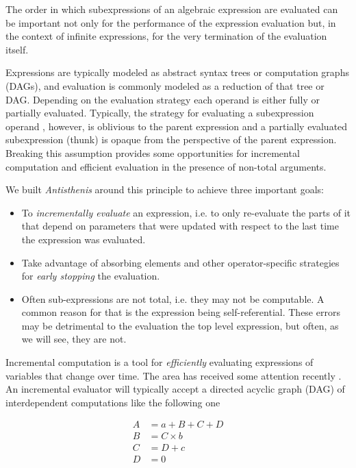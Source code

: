 The order in which subexpressions of an algebraic expression are
evaluated can be important not only for the performance of the
expression evaluation but, in the context of infinite expressions, for
the very termination of the evaluation itself.

Expressions are typically modeled as abstract syntax trees or
computation graphs (DAGs), and evaluation is commonly modeled as a
reduction of that tree or DAG. Depending on the evaluation strategy
each operand is either fully or partially evaluated. Typically, the
strategy for evaluating a subexpression operand , however, is
oblivious to the parent expression and a partially evaluated
subexpression (thunk) is opaque from the perspective of the parent
expression. Breaking this assumption provides some opportunities for
incremental computation and efficient evaluation in the presence of
non-total arguments.

We built \emph{Antisthenis} around this principle to achieve three
important goals:

\begin{itemize}
\item To \emph{incrementally evaluate} an expression, i.e. to only
  re-evaluate the parts of it that depend on parameters that were
  updated with respect to the last time the expression was evaluated.
\item Take advantage of absorbing elements and other operator-specific
  strategies for \emph{early stopping} the evaluation.
\item Often sub-expressions are not total, i.e. they may not be
  computable. A common reason for that is the expression being
  self-referential. These errors may be detrimental to the evaluation
  the top level expression, but often, as we will see, they are not.
\end{itemize}

Incremental computation is a tool for \emph{efficiently} evaluating
expressions of variables that change over time. The area has received
some attention recently
\cite{bhatotiaIncoopMapReduceIncremental2011,hammerAdaptonComposableDemanddriven2014a}. An
incremental evaluator will typically accept a directed acyclic graph
(DAG) of interdependent computations like the following one

\begin{align*}
A &= a + B + C + D  \\
B &= C \times b \\
C & = D + c \\
D &= 0
\end{align*}

